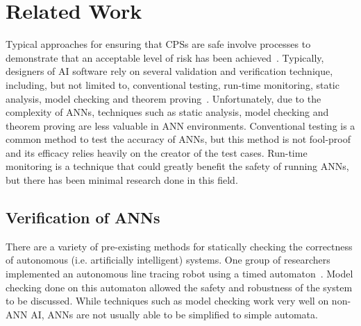 \section{Related Work}
\label{sec:related}
Typical approaches for ensuring that \acp{CPS} are safe involve processes to demonstrate that an acceptable level of risk has been achieved~\cite{scann}. 
Typically, designers of \ac{AI} software rely on several validation and verification technique, including, but not limited to, conventional testing, run-time monitoring, static analysis, model checking and theorem proving~\cite{menzies2005verification}.
Unfortunately, due to the complexity of \acfp{ANN}, techniques such as static analysis, model checking and theorem proving are less valuable in \ac{ANN} environments. 
Conventional testing is a common method to test the accuracy of \acp{ANN}, but this method is not fool-proof and its efficacy relies heavily on the creator of the test cases.
Run-time monitoring is a technique that could greatly benefit the safety of running \acp{ANN}, but there has been minimal research done in this field.


\subsection{Verification of \acp{ANN}}
There are a variety of pre-existing methods for statically checking the correctness of autonomous (i.e. artificially intelligent) systems.
One group of researchers implemented an autonomous line tracing robot using a timed automaton~\cite{timed-enf-autonomous}.
Model checking done on this automaton allowed the safety and robustness of the system to be discussed.
While techniques such as model checking work very well on non-\ac{ANN} \ac{AI}, \acp{ANN} are not usually able to be simplified to simple automata.

